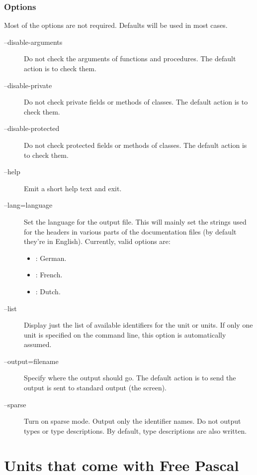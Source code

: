 \subsection{Options}
Most of the  options are not required. Defaults will be used in most
cases.

\begin{description}
\item[--disable-arguments] Do not check the arguments of functions 
and procedures. The default action is to check them.
\item[--disable-private] Do not check private fields or methods of
classes. The default action is to check them.
\item[--disable-protected] Do not check protected fields or methods of
classes. The default action is to check them.
\item[--help] Emit a short help text and exit.
\item[--lang=language] Set the language for the output file. This will mainly 
set the strings used for the headers in various parts of the documentation files 
(by default they're in English). Currently, valid options are:
\begin{itemize}
\item {}: German.
\item {}: French.
\item {}: Dutch.
\end{itemize}
\item[--list] Display just the list of available identifiers for the unit
or units. If only one unit is specified on the command line, this option 
is automatically assumed.
\item[--output=filename] Specify where the output should go. The default
action is to send the output is sent to standard output (the screen).
\item[--sparse] Turn on sparse mode. Output only the identifier names.
Do not output types or type descriptions. By default, type descriptions 
are also written.
\end{description}

\chapter{Units that come with Free Pascal}
\label{ch:Units}

